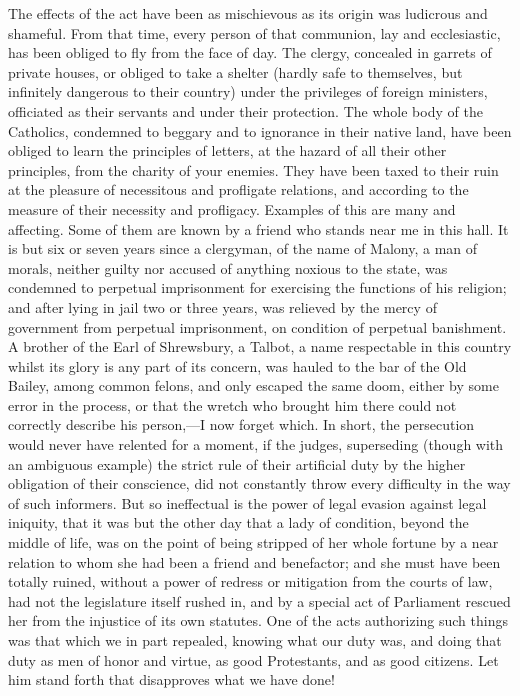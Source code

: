 The effects of the act have been as mischievous as its origin was ludicrous and shameful. From that time, every person of that communion, lay and ecclesiastic, has been obliged to fly from the face of day. The clergy, concealed in garrets of private houses, or obliged to take a shelter (hardly safe to themselves, but infinitely dangerous to their country) under the privileges of foreign ministers, officiated as their servants and under their protection. The whole body of the Catholics, condemned to beggary and to ignorance in their native land, have been obliged to learn the principles of letters, at the hazard of all their other principles, from the charity of your enemies. They have been taxed to their ruin at the pleasure of necessitous and profligate relations, and according to the measure of their necessity and profligacy. Examples of this are many and affecting. Some of them are known by a friend who stands near me in this hall. It is but six or seven years since a clergyman, of the name of Malony, a man of morals, neither guilty nor accused of anything noxious to the state, was condemned to perpetual imprisonment for exercising the functions of his religion; and after lying in jail two or three years, was relieved by the mercy of government from perpetual imprisonment, on condition of perpetual banishment. A brother of the Earl of Shrewsbury, a Talbot, a name respectable in this country whilst its glory is any part of its concern, was hauled to the bar of the Old Bailey, among common felons, and only escaped the same doom, either by some error in the process, or that the wretch who brought him there could not correctly describe his person,—I now forget which. In short, the persecution would never have relented for a moment, if the judges, superseding (though with an ambiguous example) the strict rule of their artificial duty by the higher obligation of their conscience, did not constantly throw every difficulty in the way of such informers. But so ineffectual is the power of legal evasion against legal iniquity, that it was but the other day that a lady of condition, beyond the middle of life, was on the point of being stripped of her whole fortune by a near relation to whom she had been a friend and benefactor; and she must have been totally ruined, without a power of redress or mitigation from the courts of law, had not the legislature itself rushed in, and by a special act of Parliament rescued her from the injustice of its own statutes. One of the acts authorizing such things was that which we in part repealed, knowing what our duty was, and doing that duty as men of honor and virtue, as good Protestants, and as good citizens. Let him stand forth that disapproves what we have done!

